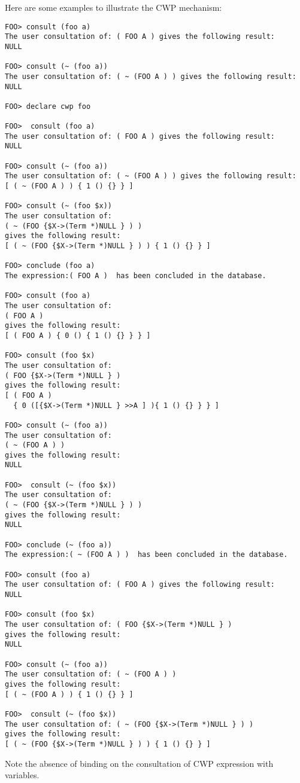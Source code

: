 Here are some examples to illustrate the CWP mechanism:
\begin{verbatim}
FOO> consult (foo a)
The user consultation of: ( FOO A ) gives the following result:
NULL

FOO> consult (~ (foo a))
The user consultation of: ( ~ (FOO A ) ) gives the following result:
NULL

FOO> declare cwp foo

FOO>  consult (foo a)
The user consultation of: ( FOO A ) gives the following result:
NULL

FOO> consult (~ (foo a))
The user consultation of: ( ~ (FOO A ) ) gives the following result:
[ ( ~ (FOO A ) ) { 1 () {} } ]

FOO> consult (~ (foo $x))
The user consultation of:
( ~ (FOO {$X->(Term *)NULL } ) )
gives the following result:
[ ( ~ (FOO {$X->(Term *)NULL } ) ) { 1 () {} } ]

FOO> conclude (foo a)
The expression:( FOO A )  has been concluded in the database.

FOO> consult (foo a)
The user consultation of:
( FOO A )
gives the following result:
[ ( FOO A ) { 0 () { 1 () {} } } ]

FOO> consult (foo $x)
The user consultation of:
( FOO {$X->(Term *)NULL } )
gives the following result:
[ ( FOO A )
  { 0 ([{$X->(Term *)NULL } >>A ] ){ 1 () {} } } ]

FOO> consult (~ (foo a))
The user consultation of:
( ~ (FOO A ) )
gives the following result:
NULL

FOO>  consult (~ (foo $x))
The user consultation of:
( ~ (FOO {$X->(Term *)NULL } ) )
gives the following result:
NULL

FOO> conclude (~ (foo a))
The expression:( ~ (FOO A ) )  has been concluded in the database.

FOO> consult (foo a)
The user consultation of: ( FOO A ) gives the following result:
NULL

FOO> consult (foo $x)
The user consultation of: ( FOO {$X->(Term *)NULL } )
gives the following result:
NULL

FOO> consult (~ (foo a))
The user consultation of: ( ~ (FOO A ) )
gives the following result:
[ ( ~ (FOO A ) ) { 1 () {} } ]

FOO>  consult (~ (foo $x))
The user consultation of: ( ~ (FOO {$X->(Term *)NULL } ) )
gives the following result:
[ ( ~ (FOO {$X->(Term *)NULL } ) ) { 1 () {} } ]
\end{verbatim}

Note the absence of binding on the consultation of CWP expression with
variables.

